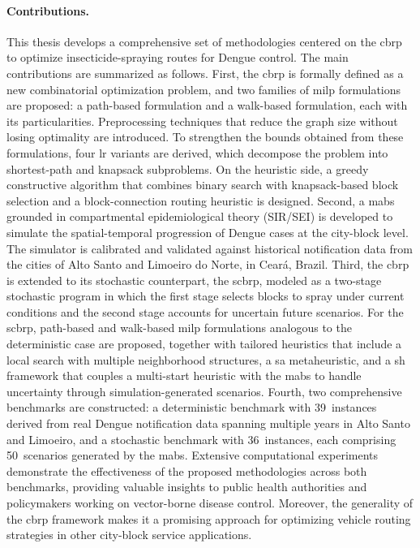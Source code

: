 \paragraph{Contributions.} This thesis develops a comprehensive set of
methodologies centered on the \gls{cbrp} to optimize insecticide-spraying
routes for Dengue control. The main contributions are summarized as follows.
First, the \gls{cbrp} is formally defined as a new combinatorial optimization
problem, and two families of \gls{milp} formulations are proposed: a path-based
formulation and a walk-based formulation, each with its particularities.
Preprocessing techniques that reduce the graph size without losing optimality are
introduced. To strengthen the bounds obtained from these formulations, four
\gls{lr} variants are derived, which decompose the problem into shortest-path
and knapsack subproblems. On the heuristic side, a greedy constructive algorithm
that combines binary search with knapsack-based block selection and a
block-connection routing heuristic is designed.
Second, a \gls{mabs} grounded in
compartmental epidemiological theory (SIR/SEI) is developed to simulate the
spatial-temporal progression of Dengue cases at the city-block level. The
simulator is calibrated and validated against historical notification data from
the cities of Alto Santo and Limoeiro do Norte, in Cear\'{a}, Brazil.
Third, the \gls{cbrp} is extended to its stochastic counterpart, the \gls{scbrp},
modeled as a two-stage stochastic program in which the first stage selects
blocks to spray under current conditions and the second stage accounts for
uncertain future scenarios. For the \gls{scbrp}, path-based and walk-based
\gls{milp} formulations analogous to the deterministic case are proposed,
together with tailored heuristics that include a local search with multiple
neighborhood structures, a \gls{sa} metaheuristic, and a \gls{sh}
framework that couples a multi-start heuristic with the \gls{mabs} to handle
uncertainty through simulation-generated scenarios. 
Fourth, two comprehensive benchmarks are constructed: a deterministic benchmark with 39~instances derived from real Dengue notification data spanning multiple years in Alto Santo and Limoeiro, and a stochastic benchmark with 36~instances, each comprising
50~scenarios generated by the \gls{mabs}. Extensive computational experiments
demonstrate the effectiveness of the proposed methodologies across both
benchmarks, providing valuable insights to public health authorities and
policymakers working on vector-borne disease control. Moreover, the generality
of the \gls{cbrp} framework makes it a promising approach for optimizing vehicle
routing strategies in other city-block service applications.

